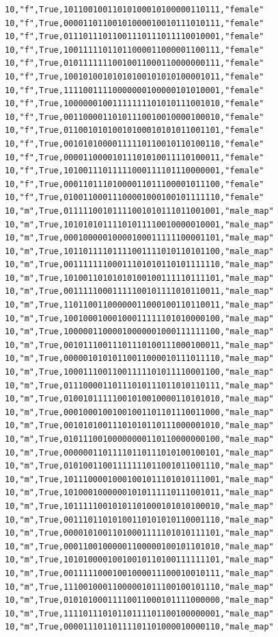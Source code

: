 \documentclass[authoryearcitations]{UoYCSproject}
\begin{document}
\begin{framed}
\begin{verbatim}
10,"f",True,10110010011010100010100000110111,"female"
10,"f",True,00001101100101000010010111010111,"female"
10,"f",True,01110111011001110111011110010001,"female"
10,"f",True,10011111011011000011000001100111,"female"
10,"f",True,01011111110010011000110000000111,"female"
10,"f",True,10010100101010100101010100001011,"female"
10,"f",True,11110011110000000100000101010001,"female"
10,"f",True,10000001001111111101010111001010,"female"
10,"f",True,00110000110101110010010000100010,"female"
10,"f",True,01100101010010100010101011001101,"female"
10,"f",True,00101010000111110110010110100110,"female"
10,"f",True,00001100001011101010011110100011,"female"
10,"f",True,10100111011111000111101110000001,"female"
10,"f",True,00011011101000011011100001011100,"female"
10,"f",True,01001100011100001000100101111110,"female"
10,"m",True,01111100101111001010111011001001,"male_map"
10,"m",True,10101010111101011110010000010001,"male_map"
10,"m",True,00010000010000100011111100001101,"male_map"
10,"m",True,10110111101111001111010110101100,"male_map"
10,"m",True,00111111100011101010110101111110,"male_map"
10,"m",True,10100110101010100100111110111101,"male_map"
10,"m",True,00111110001111100101111010110011,"male_map"
10,"m",True,11011001100000011000100110110011,"male_map"
10,"m",True,10010001000100011111101010000100,"male_map"
10,"m",True,10000011000010000001000111111100,"male_map"
10,"m",True,00101110011101110100111000100011,"male_map"
10,"m",True,00000101010110011000010111011110,"male_map"
10,"m",True,10001110011001111101011110001100,"male_map"
10,"m",True,01110000110111010111011010110111,"male_map"
10,"m",True,01001011111001010010000110101010,"male_map"
10,"m",True,00010001001001001101101110011000,"male_map"
10,"m",True,00101010011101010110111000001010,"male_map"
10,"m",True,01011100100000000110110000000100,"male_map"
10,"m",True,00000011011110110111010100100101,"male_map"
10,"m",True,01010011001111111011001011001110,"male_map"
10,"m",True,10111000010001001011101010111001,"male_map"
10,"m",True,10100010000001010111110111001011,"male_map"
10,"m",True,10111110010101101000101010100010,"male_map"
10,"m",True,00111011010100110101010110001110,"male_map"
10,"m",True,00001010011010001111101010111101,"male_map"
10,"m",True,00011001000001100000100101101010,"male_map"
10,"m",True,10101000010010010110100111111101,"male_map"
10,"m",True,00111110001001000011100010010111,"male_map"
10,"m",True,11100100011000001011100100101110,"male_map"
10,"m",True,01010100011110011000101111000000,"male_map"
10,"m",True,11110111010110111101100100000001,"male_map"
10,"m",True,00001110110111101101000010000110,"male_map"

\end{verbatim}
\end{framed}
\end{document}
